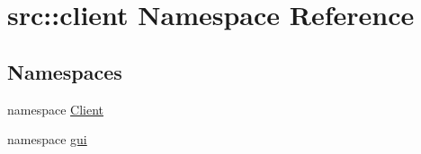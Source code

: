 \hypertarget{namespacesrc_1_1client}{
\section{src::client Namespace Reference}
\label{namespacesrc_1_1client}
}
\subsection*{Namespaces}
\begin{DoxyCompactItemize}
\item 
namespace \hyperlink{namespacesrc_1_1client_1_1Client}{Client}
\item 
namespace \hyperlink{namespacesrc_1_1client_1_1gui}{gui}
\end{DoxyCompactItemize}
